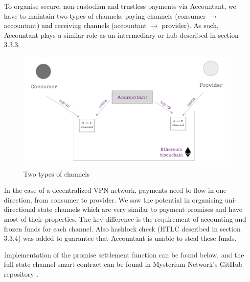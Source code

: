\documentclass[a4paper,12pt]{article}
\begin{document}
To organise secure, non-custodian and trustless payments via Accountant, we have to 
maintain two types of channels: paying channels (consumer $\rightarrow$ accountant) 
and receiving channels (accountant $\rightarrow$ provider). As such, Accountant 
plays a similar role as an intermediary or hub described in section 3.3.3.

\begin{figure}[H]
    \centering
    \includegraphics[scale=0.4]{../img/accountant-channels}
    \caption{Two types of channels}
    \label{img:accountant-channels}
\end{figure}

In the case of a decentralized VPN network, payments need to flow in one direction, 
from consumer to provider. We saw the potential in organising uni-directional state 
channels which are very similar to payment promises and have most of their 
properties. The key difference is the requirement of accounting and frozen funds 
for each channel. Also hashlock check (HTLC described in section 3.3.4) was added 
to guarantee that Accountant is unable to steal these funds.

Implementation of the promise settlement function can be found below, and the full 
state channel smart contract can be found in Mysterium Network’s GitHub repository 
\cite{smartcontracts}.
\end{document}
